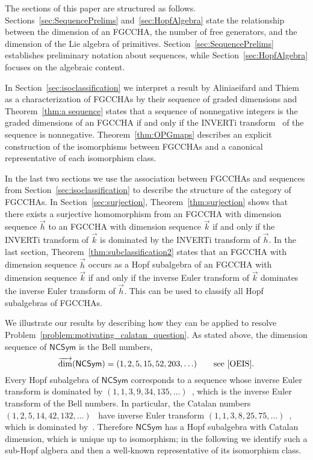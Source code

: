 \documentclass[11pt]{amsart}
\theoremstyle{definition}
\numberwithin{equation}{section}
\newcommand{\FGCCHA}{\textsf{FGCCHA}\xspace}
\newcommand{\FGCCHAs}{\textsf{FGCCHA}s\xspace}
\newcommand{\vecdim}{\overrightarrow{\dim}}
\newcommand{\NCSym}{\mathsf{NCSym}}
\begin{document}
The sections of this paper are structured as follows.
Sections~\ref{sec:SequencePrelims} and~\ref{sec:HopfAlgebra} state the
relationship between the dimension of an \FGCCHA, the number of free generators,
and the dimension of the Lie algebra of primitives. Section~\ref{sec:SequencePrelims}
establishes preliminary notation about sequences, while Section~\ref{sec:HopfAlgebra}
focuses on the algebraic content.

In Section~\ref{sec:isoclassification} we interpret a result by
Aliniaeifard and Thiem as a characterization of \FGCCHAs by their
sequence of graded dimensions and Theorem~\ref{thm:a sequence}
states that a sequence of nonnegative integers is the graded
dimensions of an \FGCCHA if and only if the INVERTi transform~\cite{OEIS}
of the sequence is nonnegative.
Theorem~\ref{thm:OPGmaps} describes an explicit construction of the
isomorphisms between \FGCCHAs and a canonical representative of each isomorphism class.

In the last two sections we use the association between \FGCCHAs
and sequences from Section~\ref{sec:isoclassification}
to describe the structure of the category of \FGCCHAs.
In Section~\ref{sec:surjection}, Theorem~\ref{thm:surjection} 
shows that there exists a surjective homomorphism from an \FGCCHA with
dimension sequence $\vec{h}$ to an \FGCCHA with dimension sequence 
$\vec{k}$ if and only if the INVERTi transform of $\vec{k}$ is dominated by 
the INVERTi transform of $\vec{h}$.
In the last section, Theorem~\ref{thm:subclassification2} states
that an \FGCCHA  with dimension sequence $\vec{h}$ occurs as a Hopf 
subalgebra of an \FGCCHA with dimension sequence $\vec{k}$ if and only if 
the inverse Euler transform of $\vec{k}$ dominates the inverse Euler transform of $\vec{h}$.  
This can be used to classify all Hopf subalgebras of \FGCCHAs.

\vspace{4ex}

We illustrate our results by describing how they can be applied to resolve Problem~\ref{problem:motivating_calatan_question}.  
As stated above, the dimension sequence of $\NCSym$ is the Bell numbers,
\[
\vecdim(\NCSym) = (1, 2, 5, 15, 52, 203, \ldots)
\qquad\text{see~\cite[\href{https://oeis.org/A000110}{A000110}]{OEIS}.}
\]
Every Hopf subalgebra of $\NCSym$ corresponds to a sequence whose inverse Euler transform is dominated by $(1, 1, 3, 9, 34, 135,\ldots)$~\cite[\href{https://oeis.org/A085686}{A085686}]{OEIS}, which is  the inverse Euler transform of the Bell numbers.  
In particular, the Catalan numbers $(1, 2, 5, 14, 42, 132, \ldots)$~\cite[\href{https://oeis.org/A000108}{A000108}]{OEIS} have inverse Euler transform $(1, 1, 3, 8, 25, 75,\ldots)$~\cite[\href{https://oeis.org/A022553}{A022553}]{OEIS}, which is dominated by~\cite[\href{https://oeis.org/A085686}{A085686}]{OEIS}.  
Therefore $\NCSym$ has a Hopf subalgebra with Catalan dimension, which is unique up to isomorphism; in the following we identify such a sub-Hopf algbera and then a well-known representative of its isomorphism class.  
\end{document}
